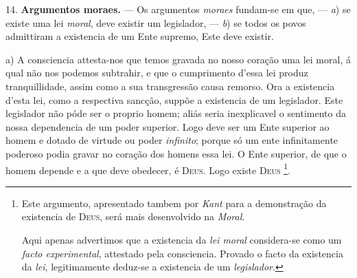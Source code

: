 14. \textbf{Argumentos moraes.} --- Os argumentos \emph{moraes} fundam-se em que, --- \emph{a}) se existe uma lei \emph{moral}, deve existir um legislador, --- \emph{b}) se todos os povos admittiram a existencia de um Ente supremo, Este deve existir.

a) A consciencia attesta-nos que temos gravada no nosso coração uma lei moral, á qual não nos podemos subtrahir, e que o cumprimento d'essa lei produz tranquillidade, assim como a sua transgressão causa remorso. Ora a existencia d'esta lei, como a respectiva sancção, suppõe a existencia de um legislador. Este legislador não póde ser o proprio homem; aliás seria inexplicavel o sentimento da nossa dependencia de um poder superior. Logo deve ser um Ente superior ao homem e dotado de virtude ou poder \emph{infinito}; porque só um ente infinitamente poderoso podia gravar no coração dos homens essa lei. O Ente superior, de que o homem depende e a que deve obedecer, é \textsc{Deus}. Logo existe \textsc{Deus} \footnote{Este argumento, apresentado tambem por \emph{Kant} para a demonstração da existencia de \textsc{Deus}, será mais desenvolvido na \emph{Moral}.\par Aqui apenas advertimos que a existencia da \emph{lei moral} considera-se como um \emph{facto experimental}, attestado pela consciencia. Provado o facto da existencia da \emph{lei}, legitimamente deduz-se a existencia de um \emph{legislador}.}.
